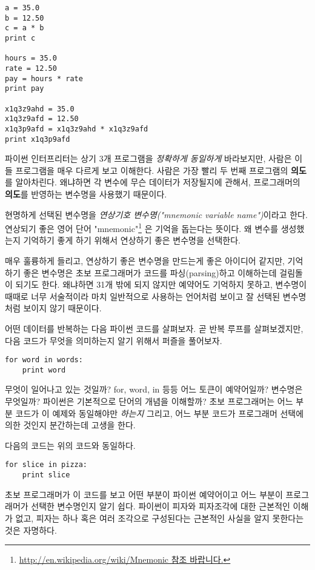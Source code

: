 \beforeverb
\begin{verbatim}
a = 35.0
b = 12.50
c = a * b
print c

hours = 35.0
rate = 12.50
pay = hours * rate
print pay

x1q3z9ahd = 35.0
x1q3z9afd = 12.50
x1q3p9afd = x1q3z9ahd * x1q3z9afd
print x1q3p9afd
\end{verbatim}
\afterverb
%
파이썬 인터프리터는 상기 3개 프로그램을 \emph{정확하게 동일하게} 바라보지만, 
사람은 이들 프로그램을 매우 다르게 보고 이해한다. 
사람은 가장 빨리 두 번째 프로그램의 {\bf 의도}를 알아차린다. 
왜냐하면 각 변수에 무슨 데이터가 저장될지에 관해서, 프로그래머의 {\bf 의도}를 반영하는 변수명을 사용했기 때문이다.

현명하게 선택된 변수명을 \emph{연상기호 변수명("mnemonic variable name")}이라고 한다. 연상되기 좋은 영어 단어 "mnemonic"\footnote{ 
\url{http://en.wikipedia.org/wiki/Mnemonic 참조 바랍니다.}}
은 기억을 돕는다는 뜻이다. 
왜 변수를 생성했는지 기억하기 좋게 하기 위해서 연상하기 좋은 변수명을 선택한다.

매우 훌륭하게 들리고, 연상하기 좋은 변수명을 만드는게 좋은 아이디어 같지만, 
기억하기 좋은 변수명은 초보 프로그래머가 코드를 파싱(parsing)하고 이해하는데 걸림돌이 되기도 한다. 
왜냐하면 31개 밖에 되지 않지만 예약어도 기억하지 못하고,
변수명이 때때로 너무 서술적이라 마치 일반적으로 사용하는 언어처럼 보이고 잘 선택된 변수명처럼 보이지 않기 때문이다.

어떤 데이터를 반복하는 다음 파이썬 코드를 살펴보자. 
곧 반복 루프를 살펴보겠지만, 다음 코드가 무엇을 의미하는지 알기 위해서 퍼즐을 풀어보자.

\beforeverb
\begin{verbatim}
for word in words:
    print word
\end{verbatim}
\afterverb
%
무엇이 일어나고 있는 것일까?
for, word, in 등등 어느 토큰이 예약어일까? 
변수명은 무엇일까? 
파이썬은 기본적으로 단어의 개념을 이해할까? 
초보 프로그래머는 어느 부분 코드가 이 예제와 동일해야만 \emph{하는지} 그리고, 
어느 부분 코드가 프로그래머 선택에 의한 것인지 분간하는데 고생을 한다.

다음의 코드는 위의 코드와 동일하다.

\beforeverb
\begin{verbatim}
for slice in pizza:
    print slice
\end{verbatim}
\afterverb
%
초보 프로그래머가 이 코드를 보고 어떤 부분이 파이썬 예약어이고 어느 부분이 프로그래머가 선택한 변수명인지 알기 쉽다. 
파이썬이 피자와 피자조각에 대한 근본적인 이해가 없고, 피자는 하나 혹은 여러 조각으로 구성된다는 근본적인 사실을 알지 못한다는 것은 자명하다.

